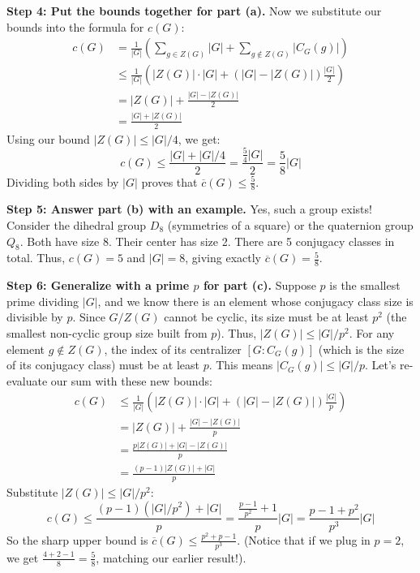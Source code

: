 \begin{solution}
\textbf{Step 4: Put the bounds together for part (a).}
Now we substitute our bounds into the formula for $c(G)$:
\begin{align*}
c(G) &= \frac{1}{|G|} \left( \sum_{g \in Z(G)} |G| + \sum_{g \notin Z(G)} |C_G(g)| \right) \\
&\leq \frac{1}{|G|} \left( |Z(G)| \cdot |G| + (|G| - |Z(G)|) \frac{|G|}{2} \right) \\
&= |Z(G)| + \frac{|G| - |Z(G)|}{2} \\
&= \frac{|G| + |Z(G)|}{2}
\end{align*}
Using our bound $|Z(G)| \leq |G|/4$, we get:
\[ c(G) \leq \frac{|G| + |G|/4}{2} = \frac{\frac{5}{4}|G|}{2} = \frac{5}{8}|G| \]
Dividing both sides by $|G|$ proves that $\overline{c}(G) \leq \frac{5}{8}$.

\textbf{Step 5: Answer part (b) with an example.}
Yes, such a group exists! Consider the dihedral group $D_8$ (symmetries of a square) or the quaternion group $Q_8$. Both have size 8.
Their center has size 2. There are 5 conjugacy classes in total.
Thus, $c(G) = 5$ and $|G| = 8$, giving exactly $\overline{c}(G) = \frac{5}{8}$.

\textbf{Step 6: Generalize with a prime $p$ for part (c).}
Suppose $p$ is the smallest prime dividing $|G|$, and we know there is an element whose conjugacy class size is divisible by $p$.
Since $G/Z(G)$ cannot be cyclic, its size must be at least $p^2$ (the smallest non-cyclic group size built from $p$). Thus, $|Z(G)| \leq |G|/p^2$.
For any element $g \notin Z(G)$, the index of its centralizer $[G : C_G(g)]$ (which is the size of its conjugacy class) must be at least $p$. This means $|C_G(g)| \leq |G|/p$.
Let's re-evaluate our sum with these new bounds:
\begin{align*}
c(G) &\leq \frac{1}{|G|} \left( |Z(G)| \cdot |G| + (|G| - |Z(G)|) \frac{|G|}{p} \right) \\
&= |Z(G)| + \frac{|G| - |Z(G)|}{p} \\
&= \frac{p|Z(G)| + |G| - |Z(G)|}{p} \\
&= \frac{(p-1)|Z(G)| + |G|}{p}
\end{align*}
Substitute $|Z(G)| \leq |G|/p^2$:
\[ c(G) \leq \frac{(p-1)(|G|/p^2) + |G|}{p} = \frac{\frac{p-1}{p^2} + 1}{p} |G| = \frac{p-1+p^2}{p^3} |G| \]
So the sharp upper bound is $\overline{c}(G) \leq \frac{p^2+p-1}{p^3}$. (Notice that if we plug in $p=2$, we get $\frac{4+2-1}{8} = \frac{5}{8}$, matching our earlier result!).
\end{solution}

